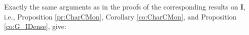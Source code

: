 \documentclass[12pt]{amsart}
\numberwithin{equation}{section}
\theoremstyle{plain}
\newtheorem{lemma}[theorem]{Lemma}
\newtheorem{remark}[theorem]{\bf Remark}
\theoremstyle{definition}
\newcommand{\lin}{\mathrel{\vphantom{<}\text{\mathsurround=0pt\ooalign{$<$\cr$-$\cr}}}}
\newcommand{\nil}{\mathrel{\vphantom{>}\text{\mathsurround=0pt\ooalign{$>$\cr$-$\cr}}}}
\newcommand{\sqni}{\mathrel{\vphantom{\sqsupset}\text{\mathsurround=0pt\ooalign{$\sqsupset$\cr$-$\cr}}}}
\newcommand \sqsp{\sqsupset}
\newcommand \sqsb{\sqsubset}
\newcommand \rt{\mathbf{0}}
\newcommand \IIb{\mathbf{I}}
\newcommand \CCub{\underline{\mathbf{C}}}
\begin{document}
 
 


 Exactly the same arguments as in the proofs of the corresponding results on $\IIb$, i.e., Proposition \ref{pr:CharCMon}, Corollary \ref{co:CharCMon}, and Proposition \ref{co:G_IDense}, give:
 
\end{document}
